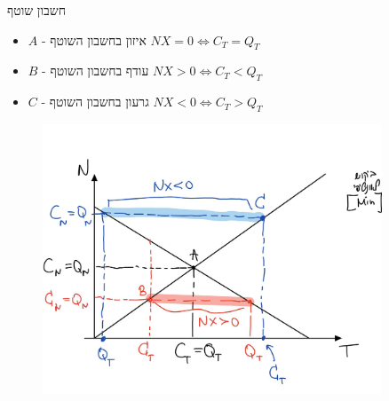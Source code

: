 \documentclass[usenames,dvipsnames]{beamer}
\newcommand{\heart}{\ensuremath\heartsuit}
\begin{document}
\begin{RTL}
\begin{frame}[allowframebreaks]
    
    \begin{block}{חשבון שוטף}
        \begin{itemize}
            \item $A$ - איזון בחשבון השוטף  $ NX = 0 \iff C_T=Q_T \quad$
            \item \color{blue}$B$ - עודף בחשבון השוטף  $ NX > 0 \iff C_T<Q_T \quad$
            \item \color{red}$C$ - גרעון בחשבון השוטף  $ NX < 0 \iff C_T>Q_T \quad$
        \end{itemize}
    \end{block}

    \framebreak
    \begin{figure}[ht]
        \centering
        \includegraphics[width=0.9\textwidth]{WhatsApp Image 2024-07-09 at 20.11.28.jpeg}
    \end{figure}
\end{frame}

\end{RTL}
\end{document}
